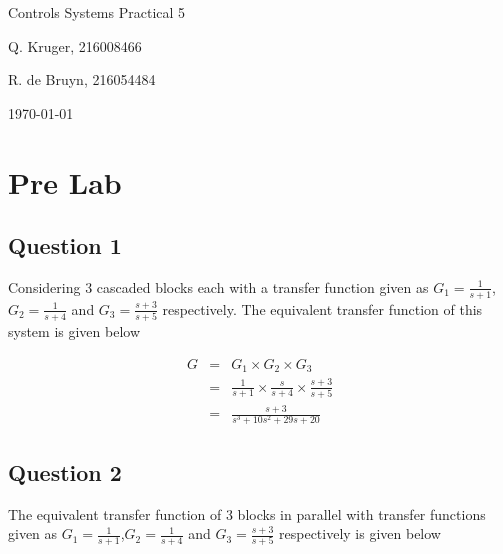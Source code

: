 \documentclass[12pt, a4paper]{article}
\begin{document}
		\begin{titlepage}
			\centering
			{\LARGE Controls Systems Practical 5 \par}
			\vspace*{1.5cm}
			{\large Q. Kruger, 216008466 \par}
			{\large R. de Bruyn, 216054484 \par}
			\vspace*{1.2cm}
			{\large \today}
			\vspace*{\fill}
			\vspace*{\fill}
		\end{titlepage}

		\tableofcontents
		\listoffigures
		\newpage

		\section{Pre Lab} %
		\label{sec:pre_lab}

		\subsection{Question 1} %
		\label{ssub:question_1}
		Considering 3 cascaded blocks each with a transfer function given as $G_1 = \frac{1}{s+1}$, $G_2 = \frac{1}{s+4}$ and $G_3 = \frac{s+3}{s+5}$ respectively. The equivalent transfer function of this system is given below

		\begin{equation}
			\begin{array}{rcl}
				G & = & G_1 \times G_2 \times G_3\\
				  & = & \frac{1}{s+1} \times \frac{s}{s+4} \times \frac{s+3}{s+5}\\
				  & = & \frac{s+3}{s^3+10s^2+29s+20}
			\end{array}
		\end{equation}
		

		\subsection{Question 2} %
		\label{sub:question_2}
		The equivalent transfer function of 3 blocks in parallel with transfer functions given as $G_1 = \frac{1}{s+1}$,$G_2 = \frac{1}{s+4}$ and $G_3 = \frac{s+3}{s+5}$ respectively is given below
\end{document}
